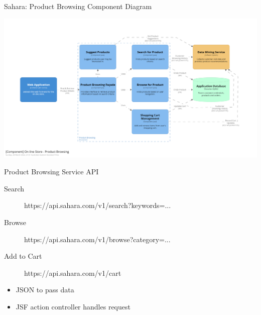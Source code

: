 \documentclass{slide}
\begin{document}
\begin{frame}{Sahara: Product Browsing Component Diagram}
    \begin{adjustwidth}{-10mm}{-10mm}
        \centering
        \includegraphics[trim=190 200 230 200,clip,width=0.97\paperwidth]{diagrams/sahara-component-browse.png}
    \end{adjustwidth}
\end{frame}

\begin{frame}{Product Browsing Service API}
    \vspace{1mm}
    {\LARGE
    \begin{description}
        \item[Search] https://api.sahara.com/v1/search?keywords=...
        \item[Browse] https://api.sahara.com/v1/browse?category=...
        \item[Add to Cart] https://api.sahara.com/v1/cart
    \end{description}
    \vspace{4mm}
    \begin{itemize}
        \item JSON to pass data
        \item JSF action controller handles request
    \end{itemize}
    }
\end{frame}
\end{document}
